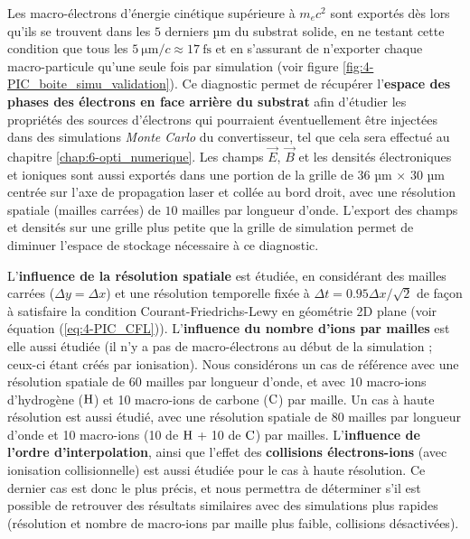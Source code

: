 \begin{refsection}
Les macro-électrons d'énergie cinétique supérieure à $m_e c^2$ sont exportés dès lors qu'ils se trouvent dans les $5$ derniers µm du substrat solide, en ne testant cette condition que tous les $5 ~ \si{\um/c} \approx 17 ~ \si{\fs}$ et en s'assurant de n'exporter chaque macro-particule qu'une seule fois par simulation (voir figure \ref{fig:4-PIC_boite_simu_validation}). Ce diagnostic permet de récupérer l'\textbf{espace des phases des électrons en face arrière du substrat} afin d'étudier les propriétés des sources d'électrons qui pourraient éventuellement être injectées dans des simulations \textit{Monte Carlo} du convertisseur, tel que cela sera effectué au chapitre \ref{chap:6-opti_numerique}. Les champs $\vec{E}$, $\vec{B}$ et les densités électroniques et ioniques sont aussi exportés dans une portion de la grille de $36$ µm $\times$ $30$ µm centrée sur l'axe de propagation laser et collée au bord droit, avec une résolution spatiale (mailles carrées) de $10$ mailles par longueur d'onde. L'export des champs et densités sur une grille plus petite que la grille de simulation permet de diminuer l'espace de stockage nécessaire à ce diagnostic.

L'\textbf{influence de la résolution spatiale} est étudiée, en considérant des mailles carrées ($\Delta y = \Delta x$) et une résolution temporelle fixée à $\Delta t = 0.95 \Delta x/\sqrt{2}$ de façon à satisfaire la condition Courant-Friedrichs-Lewy en géométrie 2D plane (voir équation (\ref{eq:4-PIC_CFL})). L'\textbf{influence du nombre d'ions par mailles} est elle aussi étudiée (il n'y a pas de macro-électrons au début de la simulation ; ceux-ci étant créés par ionisation).
Nous considérons un cas de référence avec une résolution spatiale de $60$ mailles par longueur d'onde, et avec $10$ macro-ions d'hydrogène ($\rm H$) et 10 macro-ions de carbone ($\rm C$) par maille. Un cas à haute résolution est aussi étudié, avec une résolution spatiale de $80$ mailles par longueur d'onde et 10 macro-ions (10 de $\rm H$ + 10 de $\rm C$) par mailles. L'\textbf{influence de l'ordre d'interpolation}, ainsi que l'effet des \textbf{collisions électrons-ions} (avec ionisation collisionnelle) est aussi étudiée pour le cas à haute résolution. Ce dernier cas est donc le plus précis, et nous permettra de déterminer s'il est possible de retrouver des résultats similaires avec des simulations plus rapides (résolution et nombre de macro-ions par maille plus faible, collisions désactivées). 


\end{refsection}
